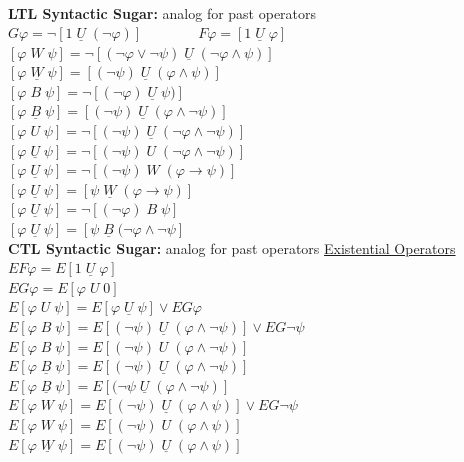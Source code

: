 \documentclass{article}
\begin{document}
\begin{multicols}{4}
\begin{align*}
\end{align*}
\textbf{LTL Syntactic Sugar:} analog for past operators
$G \varphi = \neg [ 1 \; \underline{U} \; (\neg \varphi)] \qquad \qquad F \varphi = [1\; \underline{U}\; \varphi]$ \\
$[\varphi \; W \;\psi] = \neg [(\neg \varphi \vee \neg \psi)\; \underline{U}\; (\neg \varphi \wedge \psi)]$ \\
$[\varphi \; \underline{W} \;\psi] = [(\neg \psi)\; \underline{U}\; (\varphi \wedge \psi)]$ \\
$[\varphi \; B \;\psi] = \neg [(\neg \varphi)\; \underline{U}\; \psi)]$ \\
$[\varphi \; \underline{B} \;\psi] = [(\neg \psi)\; \underline{U}\; (\varphi \wedge \neg \psi)]$ \\
$[\varphi \; U \;\psi] = \neg [(\neg \psi)\; \underline{U}\; (\neg\varphi \wedge \neg \psi)]$ \\
$[\varphi \; \underline{U} \;\psi] = \neg [(\neg \psi)\; U\; (\neg \varphi \wedge \neg \psi)]$ \\
$[\varphi \; \underline{U} \;\psi] = \neg [(\neg \psi)\; W\; (\varphi \rightarrow \psi)]$ \\
$[\varphi \; \underline{U} \;\psi] = [\psi\; \underline{W}\; (\varphi \rightarrow \psi)]$ \\
$[\varphi \; \underline{U} \;\psi] = \neg [(\neg \varphi)\; B\; \psi]$ \\
$[\varphi \; \underline{U} \;\psi] = [\psi\; \underline{B}\; (\neg \varphi \wedge \neg \psi]$ \\

\textbf{CTL Syntactic Sugar:} analog for past operators
\underline{Existential Operators}\\
$EF\varphi =  E[1 \; \underline{U} \; \varphi]  $ \\
$EG\varphi =  E[\varphi \; U \; 0]  $ \\
$E[ \varphi \; U \; \psi] =  E[\varphi \; \underline{U}\; \psi] \vee EG\varphi  $ \\
$E[ \varphi \; B \; \psi] =  E[(\neg \psi) \; \underline{U}\; (\varphi \wedge \neg \psi)] \vee EG\neg \psi  $ \\
$E[ \varphi \; B \; \psi] =  E[(\neg \psi) \; U\; (\varphi \wedge \neg \psi)] $ \\
$E[ \varphi \; \underline{B} \; \psi] =  E[(\neg \psi) \; \underline{U}\; (\varphi \wedge \neg \psi)] $ \\
$E[ \varphi \; \underline{B} \; \psi] =  E[(\neg \psi \; \underline{U}\; (\varphi \wedge \neg \psi)] $ \\
$E[ \varphi \; W \; \psi] =  E[(\neg \psi) \; \underline{U}\; (\varphi \wedge \psi)] \vee EG\neg \psi  $ \\
$E[ \varphi \; W \; \psi] =  E[(\neg \psi) \; U\; (\varphi \wedge \psi)] $ \\
$E[ \varphi \; \underline{W} \; \psi] =  E[(\neg \psi) \; \underline{U}\; (\varphi \wedge \psi)] $ \\


\end{multicols}
\end{document}
